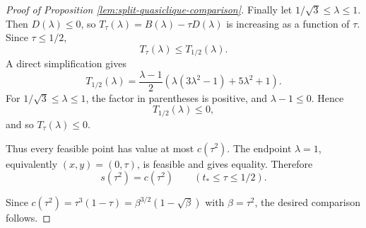 \documentclass[10pt,a4paper]{article}
\begin{document}
\begin{proof}[Proof of Proposition \ref{lem:split-quasiclique-comparison}]
Finally let \(1/\sqrt{3}\le\lambda\le1\). Then \(D(\lambda)\le0\), so
\(T_\tau(\lambda)=B(\lambda)-\tau D(\lambda)\) is increasing as a function of
\(\tau\). Since \(\tau\le1/2\),
\[
T_\tau(\lambda)\le T_{1/2}(\lambda).
\]
A direct simplification gives
\[
T_{1/2}(\lambda)
=
\frac{\lambda-1}{2}
\left(\lambda(3\lambda^2-1)+5\lambda^2+1\right).
\]
For \(1/\sqrt{3}\le\lambda\le1\), the factor in parentheses is positive, and
\(\lambda-1\le0\). Hence
\[
T_{1/2}(\lambda)\le0,
\]
and so \(T_\tau(\lambda)\le0\).


Thus every feasible point has value at most \(c(\tau^2)\). The endpoint
\(\lambda=1\), equivalently \((x,y)=(0,\tau)\), is feasible and gives
equality. Therefore
\[
s(\tau^2)=c(\tau^2)
\qquad
(t_*\le\tau\le1/2).
\]


Since \(c(\tau^2)=\tau^3(1-\tau)=\beta^{3/2}(1-\sqrt{\beta})\) with
\(\beta=\tau^2\), the desired comparison follows.
\end{proof}
\end{document}
